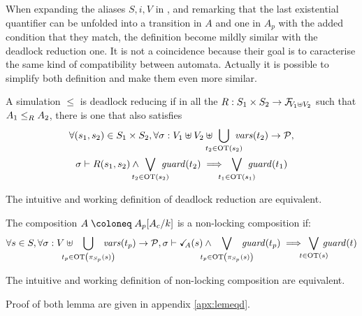 \documentclass{article}
\begin{document}
When expanding the aliases \(S, i, V\) in , and remarking that the last existential quantifier can be unfolded into a transition in \(A\) and one in \(A_p\) with the added condition that they match, the definition become mildly similar with the deadlock reduction one.
It is not a coincidence because their goal is to caracterise the same kind of compatibility between automata.
Actually it is possible to simplify both definition and make them even more similar.

\begin{defi}
A simulation \(\leq\) is deadlock reducing if in all the \(R: S_1 \times S_2 \to \rformulae[V_1 \uplus V_2]\) such that \(\wrel{A_1}{A_2}{R}\), there is one that also satisfies
\begin{multline*}
	\forall \mpar{s_1, s_2} \in S_1 \times S_2, \forall \sigma: V_1 \uplus V_2 \uplus \bigcup_\subbox{t_2 \in \fOT{s_2}} \fvars{t_2} \to \values, \\
	\sigma \vdash R\mpar{s_1, s_2} \wedge \bigvee_\subbox{t_2 \in \fOT{s_2}} \fguard{t_2} \implies \bigvee_\subbox{t_1 \in \fOT{s_1}} \fguard{t_1}
\end{multline*}
\end{defi}
\begin{lem}
The intuitive and working definition of deadlock reduction are equivalent.
\end{lem}

\begin{defi}
The composition \(A \defobject A_p\subst{A_c}{k}\) is a non-locking composition if:
\[ \forall s \in S, \forall \sigma: V \uplus \bigcup_\subbox{t_p \in \fOT{\pi_{S_p}\mpar{s}}} \fvars{t_p} \to \values, \sigma \vdash \reach{A}\mpar{s} \wedge \bigvee_\subbox{t_p \in \fOT{\pi_{S_p}\mpar{s}}} \fguard{t_p} \implies \bigvee_\subbox{t \in \fOT{s}} \fguard{t} \]
\end{defi}
\begin{lem}
The intuitive and working definition of non-locking composition are equivalent.
\end{lem}
Proof of both lemma are given in appendix \ref{apx:lemeqd}.
\end{document}
